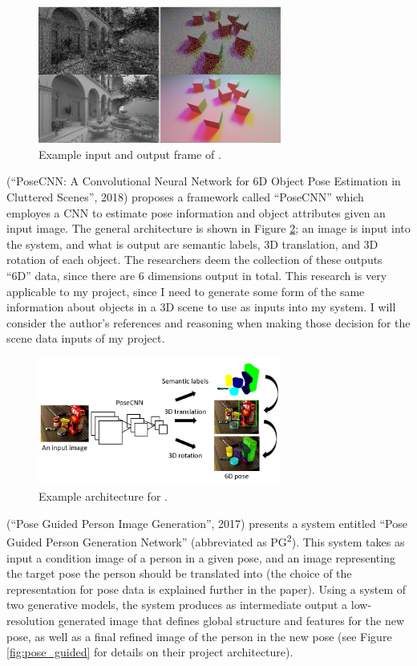 \documentclass[conference]{IEEEtran}
\begin{document}
\begin{figure}[htbp]
\centerline{\includegraphics[width=8cm]{spatiotemporal.png}}
\caption{Example input and output frame of \cite{ref:spatiotemporal}.}
\label{fig:spatiotemporal}
\end{figure}

\cite{ref:posecnn} (``PoseCNN: A Convolutional Neural Network for 6D Object Pose Estimation in
Cluttered Scenes'', 2018) proposes a framework called ``PoseCNN'' which
employes a CNN to estimate pose information and object attributes given an input
image. The general architecture is shown in Figure \ref{fig:posecnn}; an image
is input into the system, and what is output are semantic labels, 3D
translation, and 3D rotation of each object. The researchers deem the collection
of these outputs ``6D'' data, since there are 6 dimensions output in total. This
research is very applicable to my project, since I need to generate some form of
the same information about objects in a 3D scene to use as inputs into my
system. I will consider the author's references and reasoning when making those
decision for the scene data inputs of my project.

\begin{figure}[htbp]
\centerline{\includegraphics[width=8cm]{posecnn.png}}
\caption{Example architecture for \cite{ref:posecnn}.}
\label{fig:posecnn}
\end{figure}

\cite{ref:pose_guided} (``Pose Guided Person Image Generation'', 2017)
presents a system entitled
``Pose Guided Person Generation Network'' (abbreviated as
PG\textsuperscript{2}). This system takes as input a condition image
of a person in a given pose, and an image representing the target pose the person
should be translated into (the choice of the representation for pose data is explained further in the
paper). Using a system of two generative models,
the system produces as intermediate output a low-resolution generated
image that defines global structure and features for the new pose, as well as a final refined
image of the person in the new pose (see Figure \ref{fig:pose_guided} for
details on their project architecture).
\end{document}
